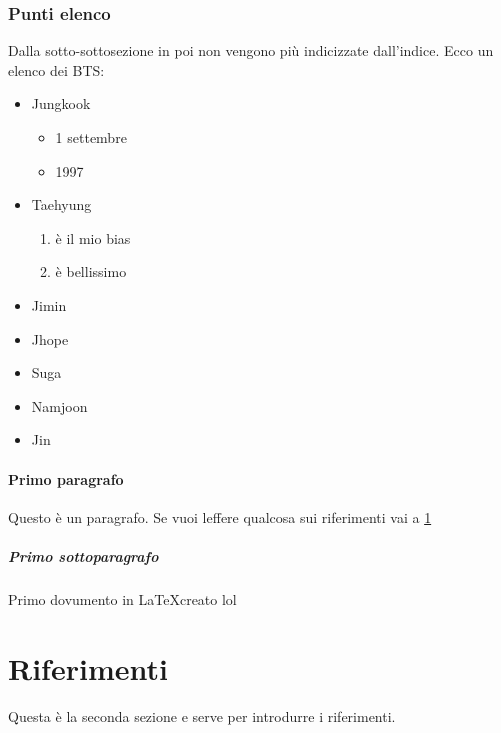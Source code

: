 \documentclass[a4paper,12pt,oneside]{book}
\begin{document}
	\subsubsection{Punti elenco}	
	Dalla sotto-sottosezione in poi non vengono più indicizzate dall'indice. Ecco un elenco dei BTS:
	\begin{itemize}
		\item Jungkook
		\begin{itemize}
			\item 1 settembre
			\item 1997
		\end{itemize}
		\item Taehyung
		\begin{enumerate}
			\item è il mio bias
			\item è bellissimo
		\end{enumerate}
		\item Jimin
		\item Jhope
		\item Suga
		\item Namjoon
		\item Jin
	\end{itemize}
	\paragraph{Primo paragrafo}
	Questo è un paragrafo. Se vuoi leffere qualcosa sui riferimenti vai a \ref{sec:my_rif}
	\subparagraph{Primo sottoparagrafo}
	Primo dovumento in \LaTeX creato lol

	\section{Riferimenti}\label{sec:my_rif}
	Questa è la seconda sezione e serve per introdurre i riferimenti.
	
	
	
	
	
\end{document}
